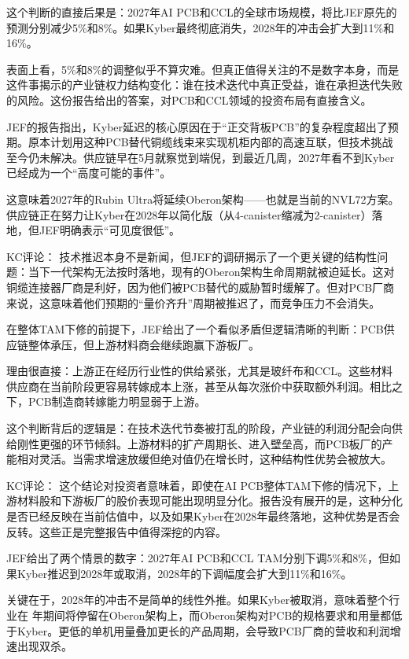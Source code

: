 \documentclass[11pt]{ctexart}
\begin{document}
这个判断的直接后果是：2027年AI PCB和CCL的全球市场规模，将比JEF原先的预测分别减少5\%和8\%。如果Kyber最终彻底消失，2028年的冲击会扩大到11\%和16\%。

表面上看，5\%和8\%的调整似乎不算灾难。但真正值得关注的不是数字本身，而是这件事揭示的产业链权力结构变化：谁在技术迭代中真正受益，谁在承担迭代失败的风险。这份报告给出的答案，对PCB和CCL领域的投资布局有直接含义。

JEF的报告指出，Kyber延迟的核心原因在于“正交背板PCB”的复杂程度超出了预期。原本计划用这种PCB替代铜缆线束来实现机柜内部的高速互联，但技术挑战至今仍未解决。供应链早在5月就察觉到端倪，到最近几周，2027年看不到Kyber已经成为一个“高度可能的事件”。

这意味着2027年的Rubin Ultra将延续Oberon架构——也就是当前的NVL72方案。供应链正在努力让Kyber在2028年以简化版（从4-canister缩减为2-canister）落地，但JEF明确表示“可见度很低”。

KC评论： 技术推迟本身不是新闻，但JEF的调研揭示了一个更关键的结构性问题：当下一代架构无法按时落地，现有的Oberon架构生命周期就被迫延长。这对铜缆连接器厂商是利好，因为他们被PCB替代的威胁暂时缓解了。但对PCB厂商来说，这意味着他们预期的“量价齐升”周期被推迟了，而竞争压力不会消失。

在整体TAM下修的前提下，JEF给出了一个看似矛盾但逻辑清晰的判断：PCB供应链整体承压，但上游材料商会继续跑赢下游板厂。

理由很直接：上游正在经历行业性的供给紧张，尤其是玻纤布和CCL。这些材料供应商在当前阶段更容易转嫁成本上涨，甚至从每次涨价中获取额外利润。相比之下，PCB制造商转嫁能力明显弱于上游。

这个判断背后的逻辑是：在技术迭代节奏被打乱的阶段，产业链的利润分配会向供给刚性更强的环节倾斜。上游材料的扩产周期长、进入壁垒高，而PCB板厂的产能相对灵活。当需求增速放缓但绝对值仍在增长时，这种结构性优势会被放大。

KC评论： 这个结论对投资者意味着，即使在AI PCB整体TAM下修的情况下，上游材料股和下游板厂的股价表现可能出现明显分化。报告没有展开的是，这种分化是否已经反映在当前估值中，以及如果Kyber在2028年最终落地，这种优势是否会反转。这些正是完整报告中值得深挖的内容。

JEF给出了两个情景的数字：2027年AI PCB和CCL TAM分别下调5\%和8\%，但如果Kyber推迟到2028年或取消，2028年的下调幅度会扩大到11\%和16\%。

关键在于，2028年的冲击不是简单的线性外推。如果Kyber被取消，意味着整个行业在 年期间将停留在Oberon架构上，而Oberon架构对PCB的规格要求和用量都低于Kyber。更低的单机用量叠加更长的产品周期，会导致PCB厂商的营收和利润增速出现双杀。
\end{document}
